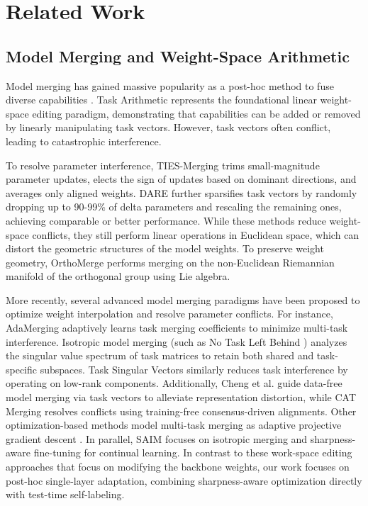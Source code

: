 \documentclass{article}
\theoremstyle{plain}
\theoremstyle{definition}
\theoremstyle{remark}
\begin{document}
\section{Related Work}
\label{submission-sec:related}

\subsection{Model Merging and Weight-Space Arithmetic}
Model merging has gained massive popularity as a post-hoc method to fuse diverse capabilities \cite{wortsman2022model, ilharco2022editing}. Task Arithmetic \cite{ilharco2022editing} represents the foundational linear weight-space editing paradigm, demonstrating that capabilities can be added or removed by linearly manipulating task vectors. However, task vectors often conflict, leading to catastrophic interference. 

To resolve parameter interference, TIES-Merging \cite{yadav2023ties} trims small-magnitude parameter updates, elects the sign of updates based on dominant directions, and averages only aligned weights. DARE \cite{yu2024dare} further sparsifies task vectors by randomly dropping up to 90-99\% of delta parameters and rescaling the remaining ones, achieving comparable or better performance. While these methods reduce weight-space conflicts, they still perform linear operations in Euclidean space, which can distort the geometric structures of the model weights. To preserve weight geometry, OrthoMerge \cite{yang2026orthogonal} performs merging on the non-Euclidean Riemannian manifold of the orthogonal group using Lie algebra. 

More recently, several advanced model merging paradigms have been proposed to optimize weight interpolation and resolve parameter conflicts. For instance, AdaMerging \cite{yang2023adamerging} adaptively learns task merging coefficients to minimize multi-task interference. Isotropic model merging (such as No Task Left Behind \cite{marczak2025no}) analyzes the singular value spectrum of task matrices to retain both shared and task-specific subspaces. Task Singular Vectors \cite{gargiulo2024task} similarly reduces task interference by operating on low-rank components. Additionally, Cheng et al. \cite{cheng2025whoever} guide data-free model merging via task vectors to alleviate representation distortion, while CAT Merging \cite{sun2025cat} resolves conflicts using training-free consensus-driven alignments. Other optimization-based methods model multi-task merging as adaptive projective gradient descent \cite{wei2025modeling}. In parallel, SAIM \cite{yu2024dare} focuses on isotropic merging and sharpness-aware fine-tuning for continual learning. In contrast to these work-space editing approaches that focus on modifying the backbone weights, our work focuses on post-hoc single-layer adaptation, combining sharpness-aware optimization directly with test-time self-labeling.
\end{document}
